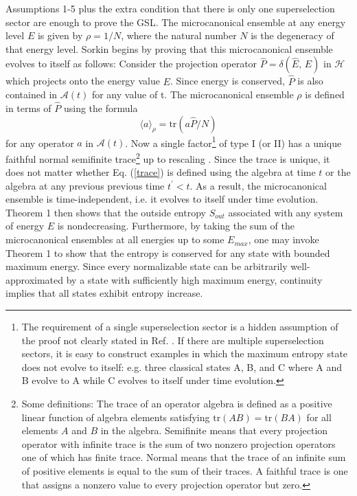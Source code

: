 \documentclass[12pt]{article}
\begin{document}
Assumptions 1-5 plus the extra condition that there is only one superselection sector are enough to prove the GSL.  The microcanonical ensemble at any energy level $E$ is given by $\rho = 1/N$, where the natural number $N$ is the degeneracy of that energy level.  Sorkin begins by proving that this microcanonical ensemble evolves to itself as follows:  Consider the projection operator $\hat{P} = \delta (\hat{E},\,E)$ in $\mathcal{H}$ which projects onto the energy value $E$.  Since energy is conserved, $\hat{P}$ is also contained in $\mathcal{A}(t)$ for any value of t.  The microcanonical ensemble $\rho$ is defined in terms of $\hat{P}$ using the formula
\begin{equation}\label{trace}
\langle a \rangle_{\rho} = \mathrm{tr}(a\hat{P}/N)
\end{equation}
for any operator $a$ in $\mathcal{A}(t)$.  Now a single factor\footnote{The requirement of a single superselection sector is a hidden assumption of the proof not clearly stated in Ref. \cite{sorkin86}.  If there are multiple superselection sectors, it is easy to construct examples in which the maximum entropy state does not evolve to itself: e.g. three classical states A, B, and C where A and B evolve to A while C evolves to itself under time evolution.} of type I (or II) has a unique faithful normal semifinite trace\footnote{Some definitions: The trace of an operator algebra is defined as a positive linear function of algebra elements satisfying $\mathrm{tr}(AB) = \mathrm{tr}(BA)$ for all elements $A$ and $B$ in the algebra.  Semifinite means that every projection operator with infinite trace is the sum of two nonzero projection operators one of which has finite trace.  Normal means that the trace of an infinite sum of positive elements is equal to the sum of their traces.  A faithful trace is one that assigns a nonzero value to every projection operator but zero.} up to rescaling \cite{KR}.  Since the trace is unique, it does not matter whether Eq. (\ref{trace}) is defined using the algebra at time $t$ or the algebra at any previous previous time $t^\prime < t$.  As a result, the microcanonical ensemble is time-independent, i.e. it evolves to itself under time evolution.  Theorem 1 then shows that the outside entropy $S_{out}$ associated with any system of energy $E$ is nondecreasing.  Furthermore, by taking the sum of the microcanonical ensembles at all energies up to some $E_{max}$, one may invoke Theorem 1 to show that the entropy is conserved for any state with bounded maximum energy.  Since every normalizable state can be arbitrarily well-approximated by a state with sufficiently high maximum energy, continuity implies that all states exhibit entropy increase.
\end{document}
